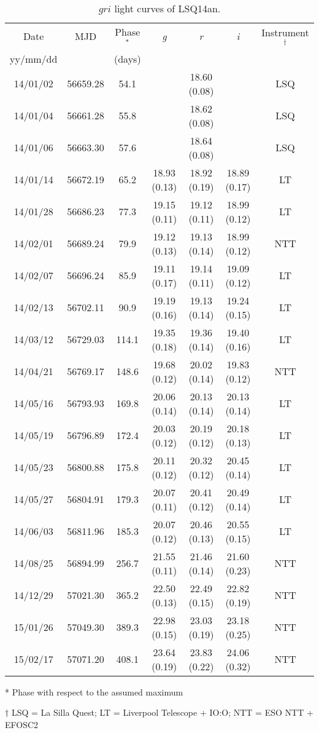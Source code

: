 \documentclass[useAMS,usenatbib]{mn2e}
\def\an{LSQ14an}
\begin{document}
\begin{table*}
\caption{$gri$ light curves of \an.}
\begin{center}
\begin{tabular}{ccccccc}
\hline
Date & MJD & Phase$^*$ & {\it g} & {\it r} & {\it i} & Instrument$^{\dagger}$\\
yy/mm/dd &  & (days)   & & & &\\
\hline
14/01/02	&	56659.28	&	54.1	&		&	18.60 (0.08)	&		&	LSQ \\
14/01/04	&	56661.28	&	55.8	&		&	18.62 (0.08)	&		&	LSQ \\
14/01/06	&	56663.30	&	57.6	&		&	18.64 (0.08)	&		&	LSQ \\
14/01/14	&	56672.19	&	65.2	&	18.93 (0.13)	&	18.92 (0.19)	&	18.89 (0.17)	&	LT \\
14/01/28	&	56686.23	&	77.3	&	19.15 (0.11)	&	19.12 (0.11)	&	18.99 (0.12)	&	LT \\
14/02/01	&	56689.24	&	79.9	&	19.12 (0.13)	&	19.13 (0.14)	&	18.99 (0.12)	&	NTT \\
14/02/07	&	56696.24	&	85.9	&	19.11 (0.17)	&	19.14 (0.11)	&	19.09 (0.12)	&	LT \\
14/02/13	&	56702.11	&	90.9	&	19.19 (0.16)	&	19.13 (0.14)	&	19.24 (0.15)	&	LT \\
14/03/12	&	56729.03	&	114.1	&	19.35 (0.18)	&	19.36 (0.14)	&	19.40 (0.16)	&	LT \\
14/04/21	&	56769.17	&	148.6	&	19.68 (0.12)	&	20.02 (0.14)	&	19.83 (0.12)	&	NTT \\
14/05/16	&	56793.93	&	169.8	&	20.06 (0.14)	&	20.13 (0.14)	&	20.13 (0.14)	&	LT \\
14/05/19	&	56796.89	&	172.4	&	20.03 (0.12)	&	20.19 (0.12)	&	20.18 (0.13)	&	LT \\
14/05/23	&	56800.88	&	175.8	&	20.11 (0.12)	&	20.32 (0.12)	&	20.45 (0.14)	&	LT \\
14/05/27	&	56804.91	&	179.3	&	20.07 (0.11)	&	20.41 (0.12)	&	20.49 (0.14)	&	LT \\
14/06/03	&	56811.96	&	185.3	&	20.07 (0.12)	&	20.46 (0.13)	&	20.55 (0.15)	&	LT \\
14/08/25	&	56894.99	&	256.7	&	21.55 (0.11)	&	21.46 (0.14)	&	21.60 (0.23)	&	NTT \\
14/12/29	&	57021.30	&	365.2	&	22.50 (0.13)	&	22.49 (0.15)	&	22.82 (0.19)	&	NTT \\
15/01/26	&	57049.30	&	389.3	&	22.98 (0.15)	&	23.03 (0.19)	&	23.18 (0.25)	&	NTT \\
15/02/17	&	57071.20	&	408.1	&	23.64 (0.19)	&	23.83 (0.22)	&	24.06 (0.32)	&	NTT \\
\hline
\end{tabular}
\end{center}
* Phase with respect to the assumed maximum

$\dagger$ LSQ = La Silla Quest; LT = Liverpool Telescope + IO:O; NTT = ESO NTT + EFOSC2
\label{table:snm}
\end{table*}%
\end{document}
